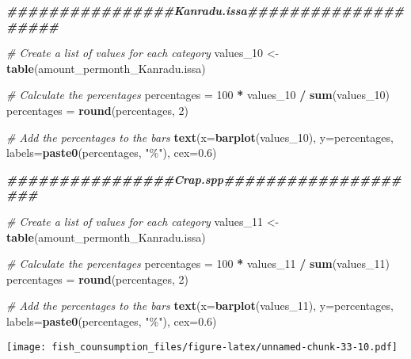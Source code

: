 \documentclass[
]{article}
\newenvironment{Shaded}{\begin{snugshade}}{\end{snugshade}}
\newcommand{\AttributeTok}[1]{\textcolor[rgb]{0.13,0.29,0.53}{#1}}
\newcommand{\CommentTok}[1]{\textcolor[rgb]{0.56,0.35,0.01}{\textit{#1}}}
\newcommand{\DecValTok}[1]{\textcolor[rgb]{0.00,0.00,0.81}{#1}}
\newcommand{\DocumentationTok}[1]{\textcolor[rgb]{0.56,0.35,0.01}{\textbf{\textit{#1}}}}
\newcommand{\FloatTok}[1]{\textcolor[rgb]{0.00,0.00,0.81}{#1}}
\newcommand{\FunctionTok}[1]{\textcolor[rgb]{0.13,0.29,0.53}{\textbf{#1}}}
\newcommand{\NormalTok}[1]{#1}
\newcommand{\OtherTok}[1]{\textcolor[rgb]{0.56,0.35,0.01}{#1}}
\newcommand{\SpecialCharTok}[1]{\textcolor[rgb]{0.81,0.36,0.00}{\textbf{#1}}}
\newcommand{\StringTok}[1]{\textcolor[rgb]{0.31,0.60,0.02}{#1}}
\begin{document}
\begin{Shaded}
\begin{Highlighting}[]
\DocumentationTok{\#\#\#\#\#\#\#\#\#\#\#\#\#\#\#\#Kanradu.issa\#\#\#\#\#\#\#\#\#\#\#\#\#\#\#\#\#\#\#\#}

\CommentTok{\# Create a list of values for each category}
\NormalTok{values\_10 }\OtherTok{\textless{}{-}} \FunctionTok{table}\NormalTok{(amount\_permonth\_Kanradu.issa)}

\CommentTok{\# Calculate the percentages}
\NormalTok{percentages }\OtherTok{=} \DecValTok{100} \SpecialCharTok{*}\NormalTok{ values\_10 }\SpecialCharTok{/} \FunctionTok{sum}\NormalTok{(values\_10)}
\NormalTok{percentages }\OtherTok{=} \FunctionTok{round}\NormalTok{(percentages, }\DecValTok{2}\NormalTok{)}

\CommentTok{\# Add the percentages to the bars}
\FunctionTok{text}\NormalTok{(}\AttributeTok{x=}\FunctionTok{barplot}\NormalTok{(values\_10), }\AttributeTok{y=}\NormalTok{percentages, }\AttributeTok{labels=}\FunctionTok{paste0}\NormalTok{(percentages, }\StringTok{"\%"}\NormalTok{), }\AttributeTok{cex=}\FloatTok{0.6}\NormalTok{)}


\DocumentationTok{\#\#\#\#\#\#\#\#\#\#\#\#\#\#\#\#Crap.spp\#\#\#\#\#\#\#\#\#\#\#\#\#\#\#\#\#\#\#\#}

\CommentTok{\# Create a list of values for each category}
\NormalTok{values\_11 }\OtherTok{\textless{}{-}} \FunctionTok{table}\NormalTok{(amount\_permonth\_Kanradu.issa)}

\CommentTok{\# Calculate the percentages}
\NormalTok{percentages }\OtherTok{=} \DecValTok{100} \SpecialCharTok{*}\NormalTok{ values\_11 }\SpecialCharTok{/} \FunctionTok{sum}\NormalTok{(values\_11)}
\NormalTok{percentages }\OtherTok{=} \FunctionTok{round}\NormalTok{(percentages, }\DecValTok{2}\NormalTok{)}

\CommentTok{\# Add the percentages to the bars}
\FunctionTok{text}\NormalTok{(}\AttributeTok{x=}\FunctionTok{barplot}\NormalTok{(values\_11), }\AttributeTok{y=}\NormalTok{percentages, }\AttributeTok{labels=}\FunctionTok{paste0}\NormalTok{(percentages, }\StringTok{"\%"}\NormalTok{), }\AttributeTok{cex=}\FloatTok{0.6}\NormalTok{)}
\end{Highlighting}
\end{Shaded}

\texttt{[image: fish\_counsumption\_files/figure-latex/unnamed-chunk-33-10.pdf]}
\end{document}

